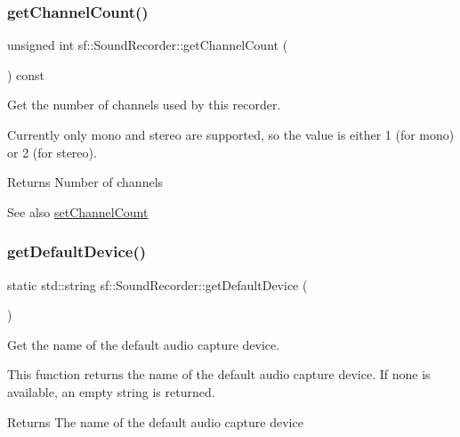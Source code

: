 \subsubsection{\texorpdfstring{get\+Channel\+Count()}{getChannelCount()}}
{\footnotesize\ttfamily unsigned int sf\+::\+Sound\+Recorder\+::get\+Channel\+Count (\begin{DoxyParamCaption}{ }\end{DoxyParamCaption}) const}



Get the number of channels used by this recorder. 

Currently only mono and stereo are supported, so the value is either 1 (for mono) or 2 (for stereo).

\begin{DoxyReturn}{Returns}
Number of channels
\end{DoxyReturn}
\begin{DoxySeeAlso}{See also}
\hyperlink{classsf_1_1_sound_recorder_ae4e22ba67d12a74966eb05fad55a317c}{set\+Channel\+Count} 
\end{DoxySeeAlso}
\mbox{\label{classsf_1_1_sound_recorder_ad1d450a80642dab4b632999d72a1bf23}} 
\subsubsection{\texorpdfstring{get\+Default\+Device()}{getDefaultDevice()}}
{\footnotesize\ttfamily static std\+::string sf\+::\+Sound\+Recorder\+::get\+Default\+Device (\begin{DoxyParamCaption}{ }\end{DoxyParamCaption})\hspace{0.3cm}{\ttfamily [static]}}



Get the name of the default audio capture device. 

This function returns the name of the default audio capture device. If none is available, an empty string is returned.

\begin{DoxyReturn}{Returns}
The name of the default audio capture device 
\end{DoxyReturn}
\mbox{\label{classsf_1_1_sound_recorder_ab16cd53c6884cbf3380c017cee72ba81}} 
